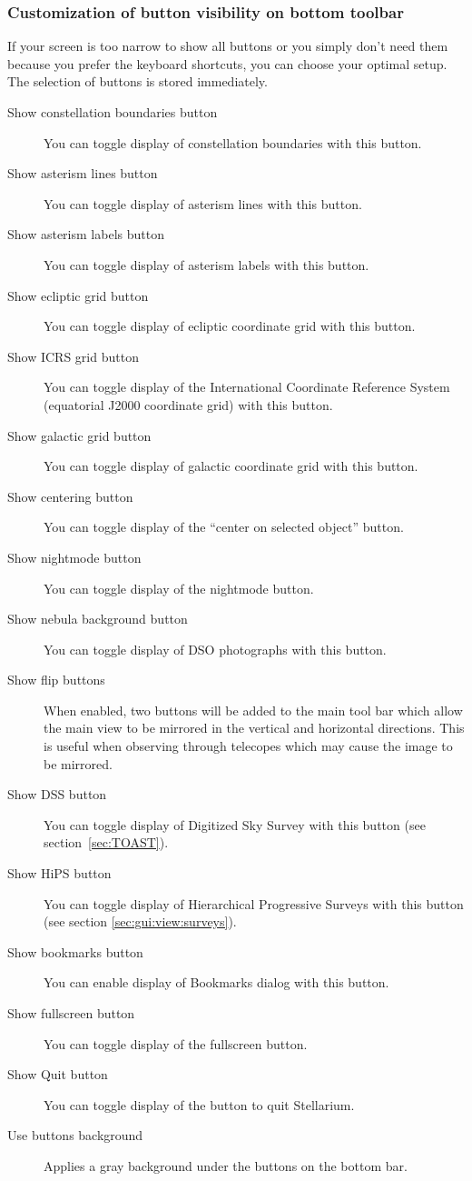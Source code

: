 \subsubsection{Customization of button visibility on bottom toolbar}
If your screen is too narrow to show all buttons
or you simply don't need them because you prefer the keyboard
shortcuts, you can choose your optimal setup. The selection of buttons is stored immediately. 
\begin{description}
\item[Show constellation boundaries button] You can toggle display of constellation boundaries with this button.
\item[Show asterism lines button] You can toggle display of asterism lines with this button.
\item[Show asterism labels button] You can toggle display of asterism labels with this button.
\item[Show ecliptic grid button] You can toggle display of ecliptic coordinate grid with this button.
\item[Show ICRS grid button] You can toggle display of the International Coordinate Reference System (equatorial J2000 coordinate grid) with this button.
\item[Show galactic grid button] You can toggle display of galactic coordinate grid with this button.
\item[Show centering button] You can toggle display of the ``center on selected object'' button.
\item[Show nightmode button] You can toggle display of the nightmode button.
\item[Show nebula background button] You can toggle display of DSO photographs with this button.
\item[Show flip buttons] When enabled, two buttons will be added to
  the main tool bar which allow the main view to be mirrored in the
  vertical and horizontal directions. This is useful when observing
  through telecopes which may cause the image to be mirrored.
\item[Show DSS button] You can toggle display of Digitized Sky Survey with this button (see section~\ref{sec:TOAST}).
\item[Show HiPS button] You can toggle display of Hierarchical Progressive Surveys with this button (see section \ref{sec:gui:view:surveys}).
\item[Show bookmarks button] You can enable display of Bookmarks dialog with this button.
\item[Show fullscreen button] You can toggle display of the fullscreen button.
\item[Show Quit button] You can toggle display of the button to quit Stellarium.
\item[Use buttons background] Applies a gray background under the buttons on the bottom bar.
\end{description}

